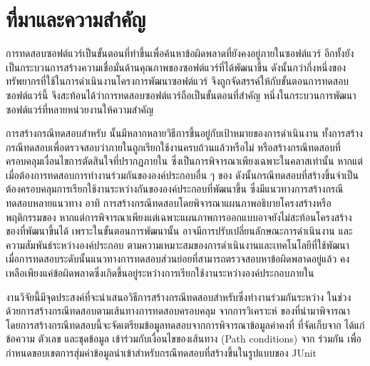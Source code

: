 \section{ที่มาและความสำคัญ} 
\label{sec:introduction}

การทดสอบซอฟต์แวร์เป็นขั้นตอนที่ทำขึ้นเพื่อค้นหาข้อผิดพลาดที่ยังคงอยู่ภายในซอฟต์แวร์ \cite{Myers:2011:AST:983238} 
อีกทั้งยังเป็นกระบวนการสร้างความเชื่อมั่นด้านคุณภาพของซอฟต์แวร์ที่ได้พัฒนาขึ้น ดังนั้นกว่ากึ่งหนึ่งของทรัพยากรที่ใช้ในการดำเนินงานโครงการพัฒนาซอฟต์แวร์
จึงถูกจัดสรรค์ให้กับขั้นตอนการทดสอบซอฟต์แวร์นี้ \cite{Jackson2007, Tassey2002} จึงสะท้อนได้ว่าการทดสอบซอฟต์แวร์ถือเป็นขั้นตอนที่สำคัญ
หนึ่งในกระบวนการพัฒนาซอฟต์แวร์ที่หลายหน่วยงานให้ความสำคัญ

การสร้างกรณีทดสอบสำหรับ\FirstTimeDefine{\SUT}{\SUTEN} นั้นมีหลากหลายวิธีการขึ้นอยู่กับเป้าหมายของการดำเนินงาน 
ทั้งการสร้างกรณีทดสอบเพื่อตรวจสอบว่า{\method}ภายใน\FirstTimeDefine{\CUT}{\CUTEN}ถูกเรียกใช้งานครบถ้วนแล้วหรือไม่ \cite{6847360}
หรือสร้างกรณีทดสอบที่ครอบคลุมเงื่อนไขการตัดสินใจที่ปรากฏภายใน{\CUT} \cite{Luanghirun2016} ซึ่งเป็นการพิจารณาเพียงเฉพาะในคลาสเท่านั้น
หากแต่เมื่อต้องการทดสอบการทำงานร่วมกันขององค์ประกอบอื่น ๆ ของ\FirstTimeDefine{\SUT}{\SUTEN} 
ดังนั้นกรณีทดสอบที่สร้างขึ้นจำเป็นต้องครอบคลุมการเรียกใช้งานระหว่างกันขององค์ประกอบที่พัฒนาขึ้น
ซึ่งมีแนวทางการสร้างกรณีทดสอบหลายแนวทาง อาทิ 
การสร้างกรณีทดสอบโดยพิจารณาแผนภาพอธิบายโครงสร้างหรือพฤติกรรมของ{\softwareComponent} \cite{Panthi2012, Shirole2013}
หากแต่การพิจารณาเพียงแต่เฉพาะแผนภาพการออกแบบอาจยังไม่สะท้อนโครงสร้างของ{\sourcecode}ที่พัฒนาขึ้นได้ 
เพราะในขั้นตอนการพัฒนานั้น อาจมีการปรับเปลี่ยนลักษณะการดำเนินงาน และความสัมพันธ์ระหว่างองค์ประกอบ 
ตามความเหมาะสมของการดำเนินงานและเทคโนโลยีที่ใช้พัฒนา 
เมื่อการทดสอบระดับ{\class}นั้นแนวทางการทดสอบส่วนย่อยที่สามารถตรวจสอบหาข้อผิดพลาดอยู่แล้ว 
คงเหลือเพียงแค่ข้อผิดพลาดซึ่งเกิดขึ้นอยู่ระหว่างการเรียกใช้งานระหว่างองค์ประกอบภายใน

งานวิจัยนี้มีจุดประสงค์ที่จะนำเสนอวิธีการสร้างกรณีทดสอบสำหรับ{\sourcecode}ซึ่งทำงานร่วมกันระหว่าง
ในช่วง\FirstTimeDefine{\IntegrationTesting}{\IntegrationTestingEN} ด้วยการสร้างกรณีทดสอบตามเส้นทางการทดสอบครอบคลุม
\FirstTimeDefine{\scg}{\scgEN} จากการวิเคราะห์\FirstTimeDefine{\StaticInformation}{\StaticInformationEN} 
ของ{\sourcecode}ที่นำมาพิจารณา โดยการสร้างกรณีทดสอบนี้จะจัดเตรียมข้อมูลทดสอบจากการพิจารณาข้อมูลค่าคงที่ 
ที่จัดเก็บจาก{\sourcecode} ได้แก่ ข้อความ ตัวเลข และชุดข้อมูล 
เข้าร่วมกับเงื่อนไขของเส้นทาง (Path conditions) จาก{\cfg} 
ร่วมกัน เพื่อกำหนดขอบเขตการสุ่มค่าข้อมูลนำเข้าสำหรับกรณีทดสอบที่สร้างขึ้นในรูปแบบของ JUnit

